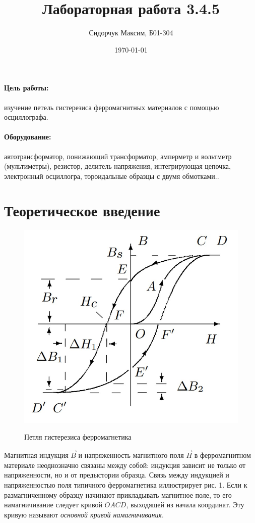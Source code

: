 \documentclass[12pt]{lab}
\title {Лабораторная работа 3.4.5}
\author{Сидорчук Максим, Б01-304}
\date{\today}
\begin{document}
\maketitle

\paragraph*{Цель работы:} изучение петель гистерезиса ферромагнитных
материалов с помощью осциллографа.

\paragraph*{Оборудование:} автотрансформатор, понижающий
трансформатор, амперметр и вольтметр (мультиметры), резистор,
делитель напряжения, интегрирующая
цепочка, электронный осциллогра, тороидальные образцы с двумя обмотками..

\section{Теоретическое введение}

\begin{figure}
    \vspace{-20pt}
    \begin{center}
        \includegraphics[width=0.7\linewidth]{gist3.jpg}
        \label{fig:sdfsafd}
    \end{center}
    \vspace{-10pt}
    \caption{Петля гистерезиса ферромагнетика}
\end{figure}

Магнитная индукция $\vec{B}$ и напряженность магнитного поля
$\vec{H}$ в ферромагнитном материале неоднозначно связаны
между собой: индукция зависит не только от напряженности, но
и от предыстории образца. Связь между индукцией
и напряженностью поля типичного ферромагнетика иллюстрирует рис. 1. Если
к размагниченному образцу начинают прикладывать магнитное поле, то
его намагничивание следует кривой $ OACD $, выходящей
из начала
координат. Эту кривую называют \textit{основной кривой намагничивания}.
\end{document}
